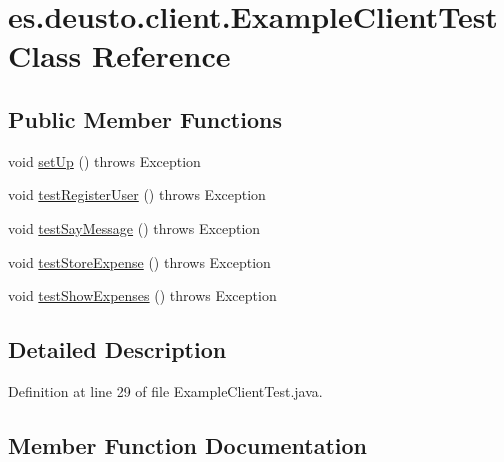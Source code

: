 \hypertarget{classes_1_1deusto_1_1client_1_1_example_client_test}{}\section{es.\+deusto.\+client.\+Example\+Client\+Test Class Reference}
\label{classes_1_1deusto_1_1client_1_1_example_client_test}
\subsection*{Public Member Functions}
\begin{DoxyCompactItemize}
\item 
void \hyperlink{classes_1_1deusto_1_1client_1_1_example_client_test_a61fde1da201769cbe17f77b8772eeeb7}{set\+Up} ()  throws Exception 
\item 
void \hyperlink{classes_1_1deusto_1_1client_1_1_example_client_test_a59d9c8bd0d8d85e0b0ded16ef0f9cb85}{test\+Register\+User} ()  throws Exception 
\item 
void \hyperlink{classes_1_1deusto_1_1client_1_1_example_client_test_a286cc9fa7dd37f1e7c19f0134d994891}{test\+Say\+Message} ()  throws Exception 
\item 
void \hyperlink{classes_1_1deusto_1_1client_1_1_example_client_test_ad8b31f30dcc49c24a0473d59f0c8d9ef}{test\+Store\+Expense} ()  throws Exception 
\item 
void \hyperlink{classes_1_1deusto_1_1client_1_1_example_client_test_adedccf184289eaf6d6cc3f53a2fdc621}{test\+Show\+Expenses} ()  throws Exception 
\end{DoxyCompactItemize}


\subsection{Detailed Description}


Definition at line 29 of file Example\+Client\+Test.\+java.



\subsection{Member Function Documentation}
\mbox{\label{classes_1_1deusto_1_1client_1_1_example_client_test_a61fde1da201769cbe17f77b8772eeeb7}} 
